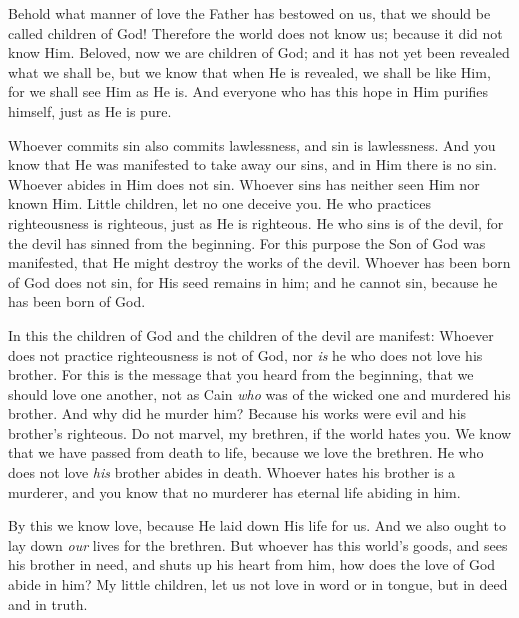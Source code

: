 
\bverse Behold what manner of love the Father has bestowed on us, that we should be called children of God! Therefore the world does not know us; because it did not know Him.
\bverse Beloved, now we are children of God; and it has not yet been revealed what we shall be, but we know that when He is revealed, we shall be like Him, for we shall see Him as He is.
\bverse And everyone who has this hope in Him purifies himself, just as He is pure.


\bverse Whoever commits sin also commits lawlessness, and sin is lawlessness.
\bverse And you know that He was manifested to take away our sins, and in Him there is no sin.
\bverse Whoever abides in Him does not sin. Whoever sins has neither seen Him nor known Him.
\bverse Little children, let no one deceive you. He who practices righteousness is righteous, just as He is righteous.
\bverse He who sins is of the devil, for the devil has sinned from the beginning. For this purpose the Son of God was manifested, that He might destroy the works of the devil.
\bverse Whoever has been born of God does not sin, for His seed remains in him; and he cannot sin, because he has been born of God.


\bverse In this the children of God and the children of the devil are manifest: Whoever does not practice righteousness is not of God, nor \textit{is} he who does not love his brother.
\bverse For this is the message that you heard from the beginning, that we should love one another,
\bverse not as Cain \textit{who} was of the wicked one and murdered his brother. And why did he murder him? Because his works were evil and his brother's righteous.
\bverse Do not marvel, my brethren, if the world hates you.
\bverse We know that we have passed from death to life, because we love the brethren. He who does not love \textit{his} brother abides in death.
\bverse Whoever hates his brother is a murderer, and you know that no murderer has eternal life abiding in him.


\bverse By this we know love, because He laid down His life for us. And we also ought to lay down \textit{our} lives for the brethren.
\bverse But whoever has this world's goods, and sees his brother in need, and shuts up his heart from him, how does the love of God abide in him?
\bverse My little children, let us not love in word or in tongue, but in deed and in truth.

